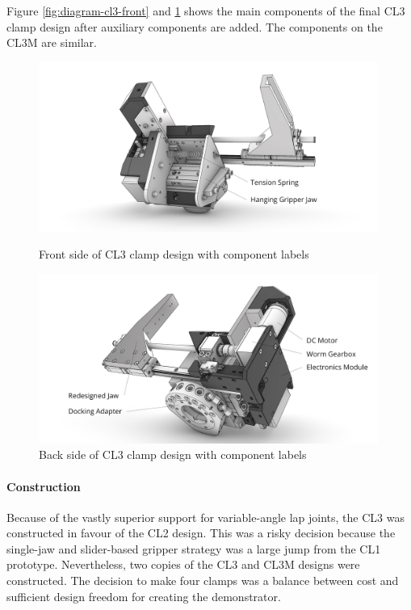 Figure \ref{fig:diagram-cl3-front} and \ref{fig:diagram-cl3-back} shows the main components of the final CL3 clamp design after auxiliary components are added. The components on the CL3M are similar.


\begin{figure}
    \centering
    \includegraphics[width=0.99\textwidth]{images/05/cl3-design-front-label.jpg }
    \caption{Front side of CL3 clamp design with component labels}
    \label{fig:diagram-cl3-front}

    \centering
    \includegraphics[width=0.99\textwidth]{images/05/cl3-design-back-labels.jpg
    }
    \caption{Back side of CL3 clamp design with component labels}
    \label{fig:diagram-cl3-back}
\end{figure}

\paragraph{Construction}

Because of the vastly superior support for variable-angle lap joints, the CL3 was constructed in favour of the CL2 design. This was a risky decision because the single-jaw and slider-based gripper strategy was a large jump from the CL1 prototype. Nevertheless, two copies of the CL3 and CL3M designs were constructed. The decision to make four clamps was a balance between cost and sufficient design freedom for creating the demonstrator.

